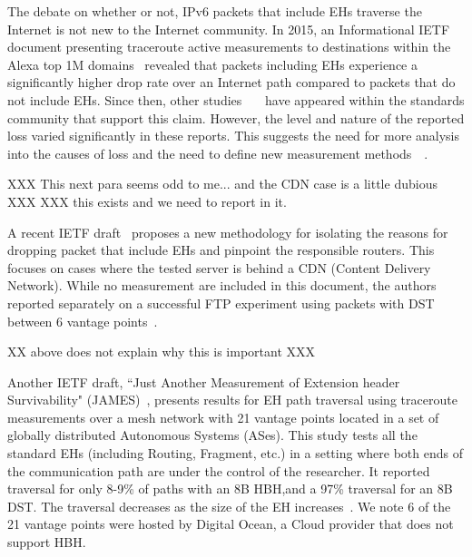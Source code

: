 \documentclass[conference]{IEEEtran}
\begin{document}
\label{sec:motivation}

The debate on whether or not, IPv6 packets that include EHs traverse the Internet is not new to the Internet community.
In 2015, an Informational IETF document presenting traceroute active
measurements to destinations within the Alexa top 1M domains~\cite{RFC7872}
revealed that packets including EHs experience a significantly higher drop rate over an
Internet path compared to packets that do not include EHs. Since then, other
studies~\cite{james}~\cite{nalini-iepg114}~\cite{apnic} have appeared within the standards community that support this claim.  However,
the level and nature of the reported loss varied significantly in these
reports.  This suggests the need for more analysis into the causes of loss and the need to define new measurement methods~\cite{james}~\cite{elkins-v6ops-eh-deepdive-fw-01}.  

XXX This next para seems odd to me... and the CDN case is a little dubious XXX
XXX  this exists and we need to report in it.

A recent IETF draft~\cite{elkins-v6ops-eh-deepdive-fw-01} proposes a new
methodology for isolating the reasons for dropping packet that include EHs and pinpoint the
responsible routers. This focuses on cases where the tested
server is behind a CDN (Content Delivery Network).  While no measurement are included in this document, the authors reported separately on a successful FTP experiment using packets with DST between 6 vantage points~\cite{nalini-iepg114}.

XX above does not explain why this is important XXX

Another IETF draft, ``Just Another Measurement of Extension header
Survivability" (JAMES)~\cite{james}, presents results for EH path traversal using
traceroute measurements over a mesh network with 21 vantage points located in a set of globally distributed Autonomous Systems (ASes). This study tests all the standard EHs
(including Routing, Fragment, etc.) in a setting where both ends of the
communication path are under the control of the researcher.  It reported traversal for
 only 8-9\% of paths with an 8B HBH,and a 97\% traversal for an 8B
DST. The traversal decreases as the size of the EH
increases~\cite{james-imc}.  We note 6 of the 21 vantage points were
hosted by Digital Ocean\texttrademark, a Cloud provider that does not support
HBH.
\end{document}
